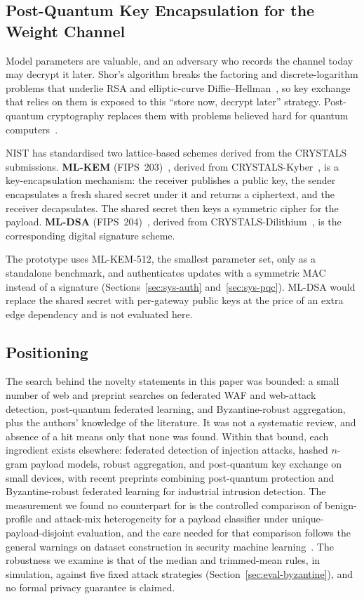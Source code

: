 \subsection{Post-Quantum Key Encapsulation for the Weight Channel}
Model parameters are valuable, and an adversary who records the channel today may decrypt it later. Shor's algorithm breaks the factoring and discrete-logarithm problems that underlie RSA and elliptic-curve Diffie--Hellman~\cite{shor1997}, so key exchange that relies on them is exposed to this ``store now, decrypt later'' strategy. Post-quantum cryptography replaces them with problems believed hard for quantum computers~\cite{bernstein2017}.

NIST has standardised two lattice-based schemes derived from the CRYSTALS submissions. \textbf{ML-KEM} (FIPS~203)~\cite{fips203}, derived from CRYSTALS-Kyber~\cite{bos2018kyber}, is a key-encapsulation mechanism: the receiver publishes a public key, the sender encapsulates a fresh shared secret under it and returns a ciphertext, and the receiver decapsulates. The shared secret then keys a symmetric cipher for the payload. \textbf{ML-DSA} (FIPS~204)~\cite{fips204}, derived from CRYSTALS-Dilithium~\cite{ducas2018dilithium}, is the corresponding digital signature scheme.

The prototype uses ML-KEM-512, the smallest parameter set, only as a standalone benchmark, and authenticates updates with a symmetric MAC instead of a signature (Sections~\ref{sec:sys-auth} and~\ref{sec:sys-pqc}). ML-DSA would replace the shared secret with per-gateway public keys at the price of an extra edge dependency and is not evaluated here.

\subsection{Positioning}
The search behind the novelty statements in this paper was bounded: a small number of web and preprint searches on federated WAF and web-attack detection, post-quantum federated learning, and Byzantine-robust aggregation, plus the authors' knowledge of the literature. It was not a systematic review, and absence of a hit means only that none was found. Within that bound, each ingredient exists elsewhere: federated detection of injection attacks, hashed $n$-gram payload models, robust aggregation, and post-quantum key exchange on small devices, with recent preprints combining post-quantum protection and Byzantine-robust federated learning for industrial intrusion detection. The measurement we found no counterpart for is the controlled comparison of benign-profile and attack-mix heterogeneity for a payload classifier under unique-payload-disjoint evaluation, and the care needed for that comparison follows the general warnings on dataset construction in security machine learning~\cite{arp2022}. The robustness we examine is that of the median and trimmed-mean rules, in simulation, against five fixed attack strategies (Section~\ref{sec:eval-byzantine}), and no formal privacy guarantee is claimed.

